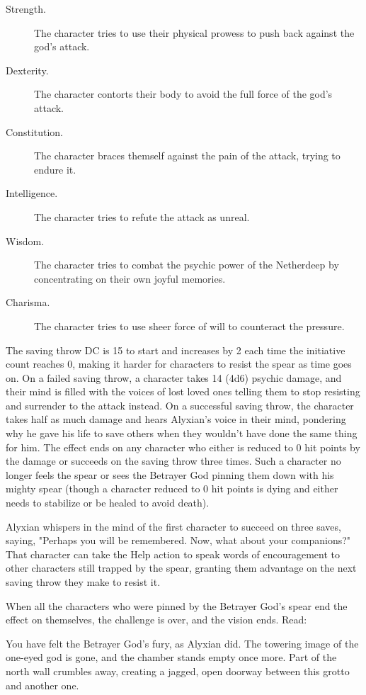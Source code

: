 \documentclass[10pt,a4paper,twoside,bg=print,twocolumn,openany,nodeprecatedcode]{dndbook}
\begin{document}
\begin{description}
\item[Strength.]
The character tries to use their physical prowess to push back against the god's attack.
\item[Dexterity.]
The character contorts their body to avoid the full force of the god's attack.
\item[Constitution.]
The character braces themself against the pain of the attack, trying to endure it.
\item[Intelligence.]
The character tries to refute the attack as unreal.
\item[Wisdom.]
The character tries to combat the psychic power of the Netherdeep by concentrating on their own joyful memories.
\item[Charisma.]
The character tries to use sheer force of will to counteract the pressure.
\end{description}

The saving throw DC is 15 to start and increases by 2 each time the initiative count reaches 0, making it harder for characters to resist the spear as time goes on. On a failed saving throw, a character takes 14 (4d6) psychic damage, and their mind is filled with the voices of lost loved ones telling them to stop resisting and surrender to the attack instead. On a successful saving throw, the character takes half as much damage and hears Alyxian's voice in their mind, pondering why he gave his life to save others when they wouldn't have done the same thing for him. The effect ends on any character who either is reduced to 0 hit points by the damage or succeeds on the saving throw three times. Such a character no longer feels the spear or sees the Betrayer God pinning them down with his mighty spear (though a character reduced to 0 hit points is dying and either needs to stabilize or be healed to avoid death).

Alyxian whispers in the mind of the first character to succeed on three saves, saying, "Perhaps you will be remembered. Now, what about your companions?" That character can take the Help action to speak words of encouragement to other characters still trapped by the spear, granting them advantage on the next saving throw they make to resist it.

When all the characters who were pinned by the Betrayer God's spear end the effect on themselves, the challenge is over, and the vision ends. Read:

\begin{DndReadAloud}{}
You have felt the Betrayer God's fury, as Alyxian did. The towering image of the one-eyed god is gone, and the chamber stands empty once more. Part of the north wall crumbles away, creating a jagged, open doorway between this grotto and another one.

\end{DndReadAloud}
\end{document}
